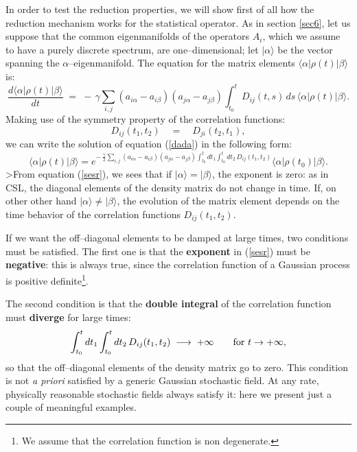 \documentclass[10pt,a4paper]{article}
\begin{document}
In order to test the reduction properties, we will show first of
all how the reduction mechanism works for the statistical
operator. As in section \ref{sec6}, let us suppose that the common
eigenmanifolds of the operators $A_{i}$, which we assume to have a
purely discrete spectrum, are one--dimensional; let
$|\alpha\rangle$ be the vector spanning the
$\alpha$--eigenmanifold. The equation for the matrix elements
$\langle\alpha|\rho(t)|\beta\rangle$ is:
\begin{equation} \label{dada}
\frac{d \langle\alpha|\rho(t)|\beta\rangle}{dt} \; = \; - \,
\gamma \sum_{i,j} (a_{i\alpha} - a_{i\beta})(a_{j\alpha} -
a_{j\beta}) \int_{t_{0}}^{t} D_{ij}(t,s)\, ds \,
\langle\alpha|\rho(t)|\beta\rangle.
\end{equation}
Making use of the symmetry property of the correlation functions:
\begin{equation}
D_{ij}(t_{1}, t_{2}) \quad = \quad D_{ji}(t_{2}, t_{1}),
\end{equation}
we can write the solution of equation (\ref{dada}) in the
following form:
\begin{equation} \label{sesr}
\langle\alpha|\rho(t)|\beta\rangle  =  e^{\displaystyle - \,
\frac{\gamma}{2} \sum_{i,j} (a_{i\alpha} - a_{i\beta})(a_{j\alpha}
- a_{j\beta}) \int_{t_{0}}^{t} dt_{1} \int_{t_{0}}^{t} dt_{2}\,
D_{ij}(t_{1},t_{2})} \langle\alpha|\rho(t_{0})|\beta\rangle.
\end{equation}
>From equation (\ref{sesr}), we sees that if $|\alpha\rangle =
|\beta\rangle$, the exponent is zero: as in CSL, the diagonal
elements of the density matrix do not change in time. If, on other
other hand $|\alpha\rangle \neq |\beta\rangle$, the evolution of
the matrix element depends on the time behavior of the correlation
functions $D_{ij}(t_{1},t_{2})$.

If we want the off--diagonal elements to be damped at large times,
two conditions must be satisfied. The first one is that the {\bf
exponent} in (\ref{sesr}) must be {\bf negative}: this is always
true, since the correlation function of a Gaussian process is
positive definite\footnote{We assume that the correlation function
is non degenerate.}.

The second condition is that the {\bf double integral} of the
correlation function must {\bf diverge} for large times:
\begin{equation} \label{cond2}
\int_{t_{0}}^{t} dt_{1} \int_{t_{0}}^{t} dt_{2}\,
D_{ij}(t_{1},t_{2}) \; \longrightarrow \; +\infty \qquad
\makebox{for $t \rightarrow +\infty$},
\end{equation}
so that the off--diagonal elements of the density matrix go to
zero. This condition is not {\it a priori} satisfied by a generic
Gaussian stochastic field. At any rate, physically reasonable
stochastic fields always satisfy it: here we present just a couple
of meaningful examples.
\end{document}
